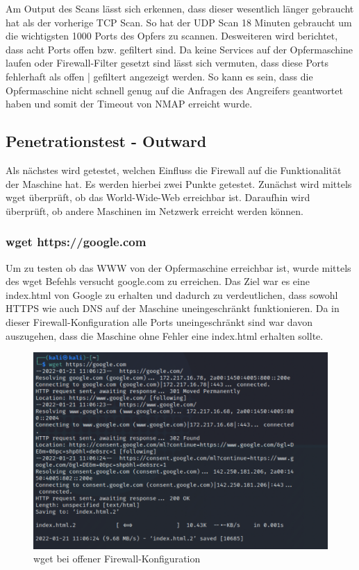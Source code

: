 

Am Output des Scans lässt sich erkennen, dass dieser wesentlich länger gebraucht hat als der vorherige TCP Scan. So hat der UDP Scan 18 Minuten gebraucht um die wichtigsten 1000 Ports des Opfers zu scannen. Desweiteren wird berichtet, dass acht Ports offen bzw. gefiltert sind. Da keine Services auf der Opfermaschine laufen oder Firewall-Filter gesetzt sind lässt sich vermuten, dass diese Ports fehlerhaft als offen | gefiltert angezeigt werden. So kann es sein, dass die Opfermaschine nicht schnell genug auf die Anfragen des Angreifers geantwortet haben und somit der Timeout von NMAP erreicht wurde. 

\subsection{Penetrationstest - Outward}
Als nächstes wird getestet, welchen Einfluss die Firewall auf die Funktionalität der Maschine hat. Es werden hierbei zwei Punkte getestet. Zunächst wird mittels wget überprüft, ob das World-Wide-Web erreichbar ist. Daraufhin wird überprüft, ob andere Maschinen im Netzwerk erreicht werden können. 

\subsubsection*{wget https://google.com}

Um zu testen ob das WWW von der Opfermaschine erreichbar ist, wurde mittels des wget Befehls versucht google.com zu erreichen. Das Ziel war es eine index.html von Google zu erhalten und dadurch zu verdeutlichen, dass sowohl HTTPS wie auch DNS auf der Maschine uneingeschränkt funktionieren. Da in dieser Firewall-Konfiguration alle Ports uneingeschränkt sind war davon auszugehen, dass die Maschine ohne Fehler eine index.html erhalten sollte. \\
\begin{figure}
	\includegraphics[width=\linewidth]{img/open-in-out-output.png}
	\caption{wget bei offener Firewall-Konfiguration}
	\label{fig:wget_open}
\end{figure}


